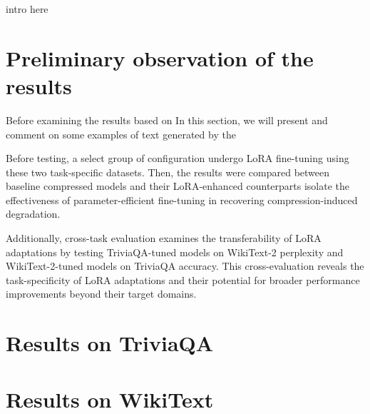 intro here

\section{Preliminary observation of the results}
Before examining the results based on In this section, we will present and comment on some examples of text generated by the 

Before testing, a select group of configuration undergo LoRA fine-tuning using these two task-specific datasets. Then, the results were compared between baseline compressed models and their LoRA-enhanced counterparts isolate the effectiveness of parameter-efficient fine-tuning in recovering compression-induced degradation.

Additionally, cross-task evaluation examines the transferability of LoRA adaptations by testing TriviaQA-tuned models on WikiText-2 perplexity and WikiText-2-tuned models on TriviaQA accuracy. This cross-evaluation reveals the task-specificity of LoRA adaptations and their potential for broader performance improvements beyond their target domains.
\section{Results on TriviaQA}
\section{Results on WikiText}